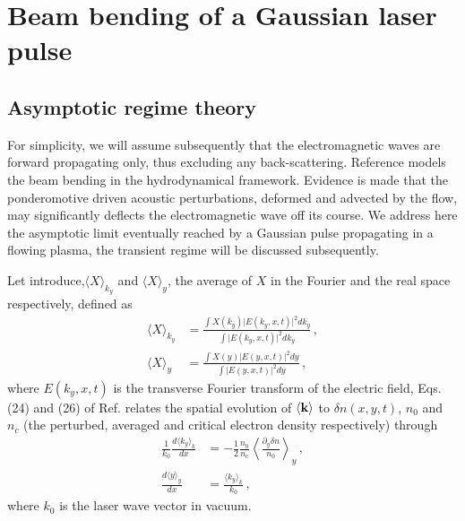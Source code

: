 \documentclass[%
 reprint,
 amsmath,amssymb,
 aps,
]{revtex4-1}
\begin{document}
\section{Beam bending of a Gaussian laser pulse}\label{sec:gauss}
\subsection{Asymptotic regime theory}
For simplicity, we will assume subsequently  that the electromagnetic waves are forward propagating only, thus excluding any back-scattering. 
Reference \cite{POP_Rose_96} models the beam bending in the hydrodynamical framework. Evidence is made that the ponderomotive driven acoustic perturbations, deformed and advected by the  flow, may significantly deflects the electromagnetic wave off its course. We address here the asymptotic limit eventually reached by a Gaussian pulse propagating in a flowing plasma, the transient regime will be discussed subsequently.

Let introduce,$ \langle X\rangle_{k_y} $ and  $ \langle X\rangle_y $, the  average of $ X $ in the Fourier and the real space respectively, defined as
\begin{align}
\langle X \rangle_{k_y} &= \frac{\int X(k_y) \vert E(k_y,x,t) \vert^2 dk_y }{\int   \vert E(k_y,x,t) \vert^2 dk_y}\, , \label{eq:kmoy}\\
\langle X \rangle_{y}&= \frac{\int X(y)\vert E(y,x,t) \vert^2 dy }{\int   \vert E(y,x,t) \vert^2 dy}\, , \label{eq:ymoy}
\end{align}
where $ E(k_y,x,t) $ is the transverse Fourier transform of the electric field, Eqs. (24) and (26) of Ref.  \cite{POP_Rose_96} relates the  spatial evolution of $ \langle \bf{k}\rangle$ to  $\delta n(x,y,t)$, $ n_0$ and $n_c$ (the perturbed, averaged and critical electron density respectively) through 
\begin{align}
 \frac{1}{k_0}\frac{d \langle k_y\rangle_{k}    }{d x}& =- \frac{1  }{2} \frac{n_0 }{n_c}   \left \langle \frac{\partial_y \delta n }{n_0}  \right  \rangle_y   \, ,\label{eq:rose26}\\
  \frac{d \langle y\rangle_{y}    }{d x} &= \frac{ \langle k_y\rangle_{k}  }{k_0} \, ,\label{eq:rose24}
\end{align}
where $k_0$ is the laser wave vector in vacuum.
\end{document}
